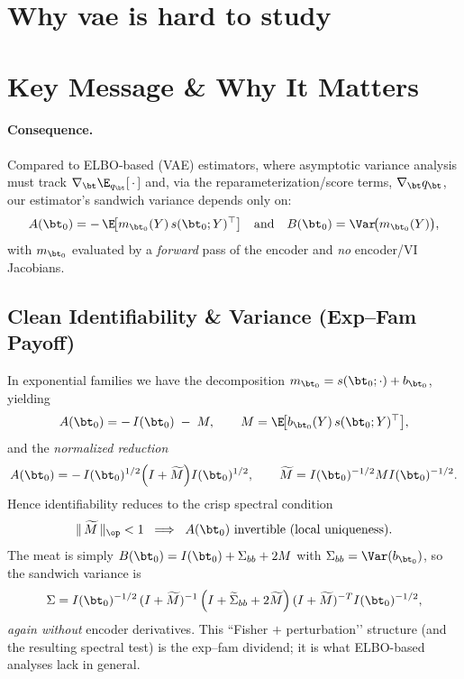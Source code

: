 \section{Why vae is hard to study}
\section*{Key Message \& Why It Matters}

\begin{center}
\end{center}

\paragraph{Consequence.} 
Compared to ELBO-based (VAE) estimators, where asymptotic variance analysis must track \(\nabla_\bt \E_{q_\bt}[\,\cdot\,]\) and, via the reparameterization/score terms, \(\nabla_\bt q_\bt\), our estimator’s sandwich variance depends only on:
\[
A(\bt_0)=-\,\E\!\big[m_{\bt_0}(Y)\,s(\bt_0;Y)^\top\big]
\quad\text{and}\quad
B(\bt_0)=\Var\!\big(m_{\bt_0}(Y)\big),
\]
with \(m_{\bt_0}\) evaluated by a \emph{forward} pass of the encoder and \emph{no} encoder/VI Jacobians.

\subsection*{Clean Identifiability \& Variance (Exp–Fam Payoff)}
In exponential families we have the decomposition \(m_{\bt_0}=s(\bt_0;\cdot)+b_{\bt_0}\), yielding
\[
A(\bt_0)=-\,I(\bt_0)\;-\;M,\qquad
M=\E\!\big[b_{\bt_0}(Y)\,s(\bt_0;Y)^\top\big],
\]
and the \emph{normalized reduction}
\[
A(\bt_0)=-\,I(\bt_0)^{1/2}\Big(I+\widetilde M\Big)I(\bt_0)^{1/2},\qquad
\widetilde M=I(\bt_0)^{-1/2}MI(\bt_0)^{-1/2}.
\]
Hence identifiability reduces to the crisp spectral condition
\[
\|\,\widetilde M\,\|_{\op}<1 \;\;\Longrightarrow\;\; A(\bt_0)\text{ invertible (local uniqueness).}
\]
The meat is simply \(B(\bt_0)=I(\bt_0)+\Sigma_{bb}+2M\) with \(\Sigma_{bb}=\Var(b_{\bt_0})\), so the sandwich variance is
\[
\Sigma = I(\bt_0)^{-1/2}\,(I+\widetilde M)^{-1}\,\Big(I+\widetilde\Sigma_{bb}+2\widetilde M\Big)\,(I+\widetilde M)^{-T} I(\bt_0)^{-1/2},
\]
\emph{again without} encoder derivatives. This “Fisher \(+\) perturbation’’ structure (and the resulting spectral test) is the exp–fam dividend; it is what ELBO-based analyses lack in general.

